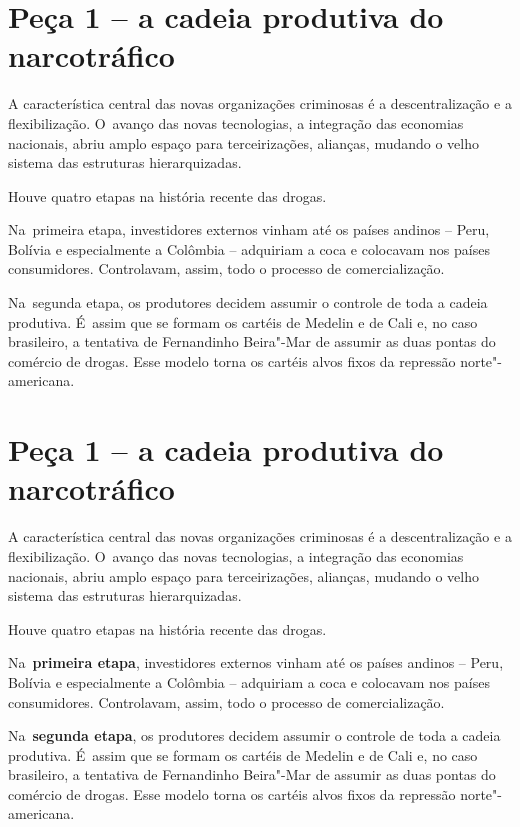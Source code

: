  

\section{Peça 1 -- a cadeia produtiva do narcotráfico}

A característica central das novas organizações criminosas é a
descentralização e a flexibilização. O~avanço das novas tecnologias, a
integração das economias nacionais, abriu amplo espaço para
terceirizações, alianças, mudando o velho sistema das estruturas
hierarquizadas.

Houve quatro etapas na história recente das drogas.

Na~primeira etapa, investidores externos vinham até os países andinos --
Peru, Bolívia e especialmente a Colômbia -- adquiriam a coca e colocavam
nos países consumidores. Controlavam, assim, todo o processo de
comercialização.

Na~segunda etapa, os produtores decidem assumir o controle de toda a
cadeia produtiva. É~assim que se formam os cartéis de Medelin e de Cali
e, no caso brasileiro, a tentativa de Fernandinho Beira"-Mar de assumir
as duas pontas do comércio de drogas. Esse modelo torna os cartéis alvos
fixos da repressão norte"-americana.

 

\section{Peça 1 -- a cadeia produtiva do narcotráfico}

A característica central das novas organizações criminosas é a
descentralização e a flexibilização. O~avanço das novas tecnologias, a
integração das economias nacionais, abriu amplo espaço para
terceirizações, alianças, mudando o velho sistema das estruturas
hierarquizadas.

Houve quatro etapas na história recente das drogas.

Na~\textbf{primeira etapa}, investidores externos vinham até os países
andinos -- Peru, Bolívia e especialmente a Colômbia -- adquiriam a coca
e colocavam nos países consumidores. Controlavam, assim, todo o processo
de comercialização.

Na~\textbf{segunda etapa}, os produtores decidem assumir o controle de
toda a cadeia produtiva. É~assim que se formam os cartéis de Medelin e
de Cali e, no caso brasileiro, a tentativa de Fernandinho Beira"-Mar de
assumir as duas pontas do comércio de drogas. Esse modelo torna os
cartéis alvos fixos da repressão norte"-americana.

